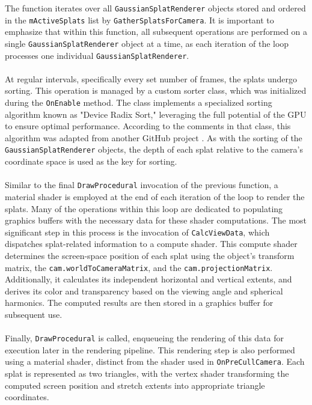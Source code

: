 \documentclass[12pt]{article}
\begin{document}
The function iterates over all \texttt{GaussianSplatRenderer} objects stored and ordered in the \texttt{m\textunderscore ActiveSplats} list by \texttt{GatherSplatsForCamera}. It is important to emphasize that within this function, all subsequent operations are performed on a single \texttt{GaussianSplatRenderer} object at a time, as each iteration of the loop processes one individual \texttt{GaussianSplatRenderer}.\\\\
At regular intervals, specifically every set number of frames, the splats undergo sorting. This operation is managed by a custom sorter class, which was initialized during the \texttt{OnEnable} method. The class implements a specialized sorting algorithm known as "Device Radix Sort," leveraging the full potential of the GPU to ensure optimal performance. According to the comments in that class, this algorithm was adapted from another GitHub project \parencite{Sorting}. As with the sorting of the \texttt{GaussianSplatRenderer} objects, the depth of each splat relative to the camera’s coordinate space is used as the key for sorting.
\\\\
Similar to the final \texttt{DrawProcedural} invocation of the previous function, a material shader is employed at the end of each iteration of the loop to render the splats. Many of the operations within this loop are dedicated to populating graphics buffers with the necessary data for these shader computations. The most significant step in this process is the invocation of \texttt{CalcViewData}, which dispatches splat-related information to a compute shader. This compute shader determines the screen-space position of each splat using the object's transform matrix, the \texttt{cam.worldToCameraMatrix}, and the \texttt{cam.projectionMatrix}. Additionally, it calculates its independent horizontal and vertical extents, and derives its color and transparency based on the viewing angle and spherical harmonics. The computed results are then stored in a graphics buffer for subsequent use. \\\\
Finally, \texttt{DrawProcedural} is called, enqueueing the rendering of this data for execution later in the rendering pipeline. This rendering step is also performed using a material shader, distinct from the shader used in \texttt{OnPreCullCamera}. Each splat is represented as two triangles, with the vertex shader transforming the computed screen position and stretch extents into appropriate triangle coordinates.
\end{document}
